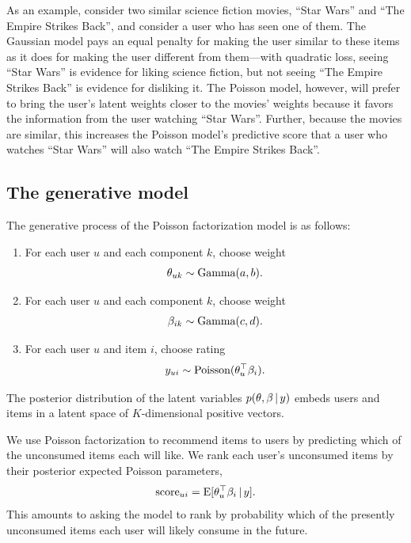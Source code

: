 \documentclass{sig-alternate}
\begin{document}
As an example, consider two similar science fiction movies, ``Star
Wars'' and ``The Empire Strikes Back'', and consider a user who has
seen one of them.  The Gaussian model pays an equal penalty for making
the user similar to these items as it does for making the user
different from them---with quadratic loss, seeing ``Star Wars'' is
evidence for liking science fiction, but not seeing ``The Empire
Strikes Back'' is evidence for disliking it.  The Poisson model,
however, will prefer to bring the user's latent weights closer to the
movies' weights because it favors the information from the user
watching ``Star Wars''. Further, because the movies are similar, this
increases the Poisson model's predictive score that a user who watches
``Star Wars'' will also watch ``The Empire Strikes Back''.


\subsection{The generative model}

The generative process of the Poisson factorization model is as
follows:
\begin{enumerate}
\item For each user $u$ and each component $k$, choose weight
  \begin{equation*}
    \theta_{uk} \sim \textrm{Gamma}(a, b).
  \end{equation*}
\item For each user $u$ and each component $k$, choose weight
  \begin{equation*}
    \beta_{ik} \sim \textrm{Gamma}(c, d).
  \end{equation*}
\item For each user $u$ and item $i$, choose rating
  \begin{equation*}
    y_{ui} \sim \textrm{Poisson}(\theta_u^\top \beta_i).
  \end{equation*}
\end{enumerate}
The posterior distribution of the latent variables $p(\theta, \beta \,\vert\,
y)$ embeds users and items in a latent space of $K$-dimensional
positive vectors.

We use Poisson factorization to recommend items to users by predicting
which of the unconsumed items each will like.  We rank each user's
unconsumed items by their posterior expected Poisson parameters,
\begin{equation}
  \label{eq:score}
  \textrm{score}_{ui} = \textrm{E}[\theta_u^\top \beta_i \,\vert\, y].
\end{equation}
This amounts to asking the model to rank by probability which of the
presently unconsumed items each user will likely consume in the
future.
\end{document}
